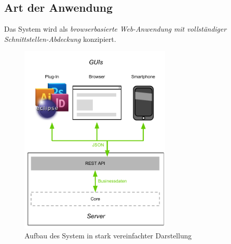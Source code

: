 \subsection{Art der Anwendung}\label{l:loesungsart}

Das System wird als \emph{browserbasierte Web-Anwendung mit vollständiger Schnittstellen-Abdeckung} konzipiert. 

\begin{figure}[htb]
\begin{center}
\includegraphics[width=0.65\textwidth]{media/ArtdesSystems.pdf}
\caption{Aufbau des System in stark vereinfachter Darstellung}
\label{chart:aufbaudessystems}
\end{center}
\end{figure}

